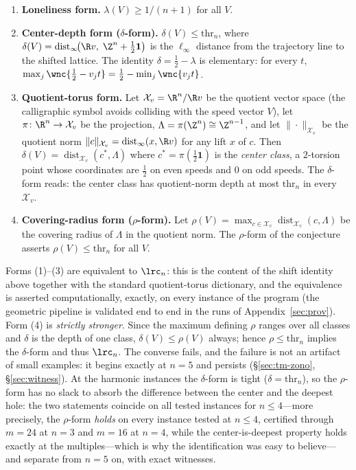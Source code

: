 \begin{enumerate}[leftmargin=1.6em,itemsep=2pt]
\item \textbf{Loneliness form.} $\lambda(V)\ge 1/(n+1)$ for all $V$.
\item \textbf{Center-depth form ($\delta$-form).}
$\delta(V)\le \mathrm{thr}_n$, where
$\delta(V)=\operatorname{dist}_\infty\!\bigl(\R v,\;\Z^n+\tfrac12\mathbf{1}\bigr)$
is the $\ell_\infty$ distance from the trajectory line to the shifted
lattice. The identity
$\delta=\tfrac12-\lambda$ is elementary: for every $t$,
$\max_j \wnc{\tfrac12-v_jt}=\tfrac12-\min_j\wnc{v_jt}$.
\item \textbf{Quotient-torus form.} Let $\mathcal{X}_v=\R^n/\R v$ be
the quotient vector space (the calligraphic symbol avoids colliding with
the speed vector $V$), let $\pi\colon\R^n\to\mathcal{X}_v$ be the
projection, $\Lambda=\pi(\Z^n)\cong\Z^{n-1}$, and let
$\|\cdot\|_{\mathcal{X}_v}$ be the quotient norm
$\|c\|_{\mathcal{X}_v}=\operatorname{dist}_\infty(x,\R v)$ for any lift
$x$ of $c$. Then $\delta(V)=\operatorname{dist}_{\mathcal{X}_v}(c^*,\Lambda)$
where $c^*=\pi(\tfrac12\mathbf{1})$ is the \emph{center class}, a
$2$-torsion point whose coordinates are $\tfrac12$ on even speeds and $0$
on odd speeds. The $\delta$-form reads: the center class has quotient-norm
depth at most $\mathrm{thr}_n$ in every $\mathcal{X}_v$.
\item \textbf{Covering-radius form ($\rho$-form).}
Let $\rho(V)=\max_{c\in\mathcal{X}_v}\operatorname{dist}_{\mathcal{X}_v}(c,
\Lambda)$ be the covering radius of $\Lambda$ in the quotient norm. The
$\rho$-form of the conjecture asserts $\rho(V)\le\mathrm{thr}_n$ for all
$V$.
\end{enumerate}

Forms (1)--(3) are equivalent to $\lrc_n$: this is the content of the
shift identity above together with the standard quotient-torus dictionary,
and the equivalence is asserted computationally, exactly, on every
instance of the program (the geometric pipeline is validated end to end
in the runs of Appendix~\ref{sec:prov}). Form (4) is \emph{strictly
stronger}. Since the maximum defining $\rho$ ranges over all classes and
$\delta$ is the depth of one class, $\delta(V)\le\rho(V)$ always; hence
$\rho\le\mathrm{thr}_n$ implies the $\delta$-form and thus $\lrc_n$. The
converse fails, and the failure is not an artifact of small examples: it
begins exactly at $n=5$ and persists (\S\ref{sec:tm-zono},
\S\ref{sec:witness}). At the harmonic instances the $\delta$-form is
tight ($\delta=\mathrm{thr}_n$), so the $\rho$-form has no slack to
absorb the difference between the center and the deepest hole: the
two statements coincide on all tested instances for $n\le 4$---more
precisely, the $\rho$-form \emph{holds} on every instance tested at
$n\le 4$, certified through $m=24$ at $n=3$ and $m=16$ at $n=4$, while
the center-is-deepest property holds exactly at the multiples---which is
why the identification was easy to believe---and separate from $n=5$ on,
with exact witnesses.

